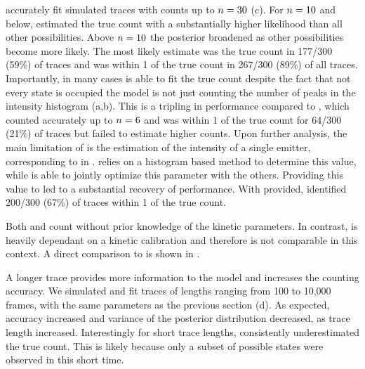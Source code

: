 \ours accurately fit simulated traces with counts up to $n=30$ (c).
	For $n=10$ and below, \ours estimated the true count with a substantially 
	higher likelihood than all other possibilities. 
	Above $n=10$ the posterior broadened as other possibilities become more likely. 
	The most likely estimate was the true count in 177/300 (59\%) of traces and 
	was within 1 of the true count in 267/300 (89\%) of all traces.
	Importantly, in many cases \ours is able to fit the true count despite the fact that 
	not every state is occupied \ie the model is not just counting the 
	number of peaks in the intensity histogram (a,b).
	This is a tripling in performance compared to \lbfcs, which counted 
	accurately up to $n=6$ and was within 1 of the true count for 64/300 (21\%) of traces 
	but failed to estimate higher counts.
	Upon further analysis, the main limitation of \lbfcs is the estimation of the 
	intensity of a single emitter, corresponding to \re in \ours. 
	\lbfcs relies on a histogram based method to determine this value, while 
	\ours is able to jointly optimize this parameter with the others.
	Providing this value to \lbfcs led to a substantial recovery of performance.
	With \re provided, \lbfcs identified 200/300 (67\%) of traces within 1 of the true count. 

Both \ours and \lbfcs count without prior knowledge of the kinetic parameters.
	In contrast, \qpaint is heavily dependant on a kinetic calibration and 
	therefore is not comparable in this context.
	A direct comparison to \qpaint is shown in .

A longer trace provides more
information to the model and increases the counting accuracy.
	We simulated and fit traces of lengths ranging from 100 to 10,000 frames, with the same parameters 
	as the previous section (d).
	As expected, accuracy increased and variance of the posterior distribution decreased, 
	as trace length increased.
	Interestingly for short trace lengths, \ours consistently underestimated the true count. 
	This is likely because only a subset of possible states were observed in this short time. %

